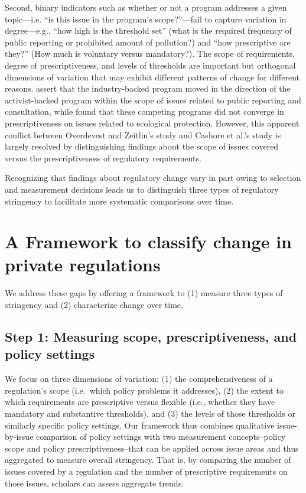 \documentclass[
      12pt,
            Review ]{article}
\begin{document}
Second, binary indicators such as whether or not a program addresses a
given topic---i.e. ``is this issue in the program's scope?''---fail to
capture variation in degree---e.g., ``how high is the threshold set''
(what is the required frequency of public reporting or prohibited amount
of pollution?) and ``how prescriptive are they?'' (How much is voluntary
versus mandatory?). The scope of requirements, degree of
prescriptiveness, and levels of thresholds are important but orthogonal
dimensions of variation that may exhibit different patterns of change
for different reasons. \citet{Overdevest2014} assert that the
industry-backed program moved in the direction of the activist-backed
program within the scope of issues related to public reporting and
consultation, while \citet{Cashore2004} found that these competing
programs did not converge in prescriptiveness on issues related to
ecological protection. However, this apparent conflict between
Overdevest and Zeitlin's study and Cashore et al.'s study is largely
resolved by distinguishing findings about the scope of issues covered
versus the prescriptiveness of regulatory requirements.

Recognizing that findings about regulatory change vary in part owing to
selection and measurement decisions leads us to distinguish three types
of regulatory stringency to facilitate more systematic comparisons over
time.

\section{A Framework to classify change in private
regulations}\label{a-framework-to-classify-change-in-private-regulations}

We address these gaps by offering a framework to (1) measure three types
of stringency and (2) characterize change over time.

\subsection{Step 1: Measuring scope, prescriptiveness, and policy
settings}\label{step-1-measuring-scope-prescriptiveness-and-policy-settings}

We focus on three dimensions of variation: (1) the comprehensiveness of
a regulation's scope (i.e.~which policy problems it addresses), (2) the
extent to which requirements are prescriptive versus flexible (i.e.,
whether they have mandatory and substantive thresholds), and (3) the
levels of those thresholds or similarly specific policy settings. Our
framework thus combines qualitative issue-by-issue comparison of policy
settings with two measurement concepts--policy scope and policy
prescriptiveness--that can be applied across issue areas and thus
aggregated to measure overall stringency. That is, by comparing the
number of issues covered by a regulation and the number of prescriptive
requirements on those issues, scholars can assess aggregate trends.
\end{document}
